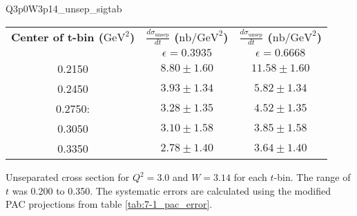 \begin{Mtable}{Q3p0W3p14_unsep_sigtab}
  \centering
  \begin{tabular}{|c|c|c|}
    \hline
    \textbf{Center of t-bin ($\mathrm{GeV}^2$)} & \textbf{$\frac{d\sigma_{\mathrm{unsep}}}{dt}$ ($\mathrm{nb/GeV}^2$)} & \textbf{$\frac{d\sigma_{\mathrm{unsep}}}{dt}$ ($\mathrm{nb/GeV}^2$)} \\
    & $\epsilon=0.3935$ & $\epsilon=0.6668$ \\
    \hline
    0.2150 & $8.80\pm1.60$ & $11.58\pm1.60$\\
    0.2450 & $3.93\pm1.34$ & $5.82\pm1.34$\\
    0.2750: & $3.28\pm1.35$ & $4.52\pm1.35$\\
    0.3050 & $3.10\pm1.58$ & $3.85\pm1.58$\\
    0.3350 & $2.78\pm1.40$ & $3.64\pm1.40$\\
    \hline
  \end{tabular}
  \caption{Unseparated cross section for $Q^2=3.0$ and $W=3.14$ for each $t$-bin. The range of $t$ was 0.200 to 0.350. The systematic errors are calculated using the modified PAC projections from table \ref{tab:7-1_pac_error}.}
  \label{tab:Q3p0W3p14_unsep_sigtab}
\end{Mtable}


